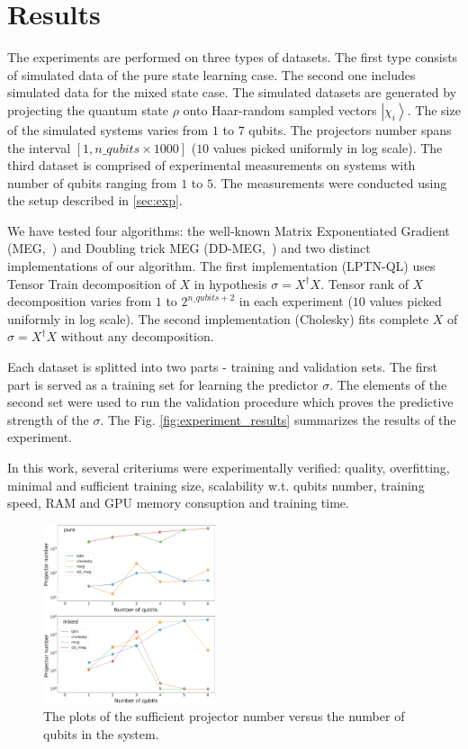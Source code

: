 \documentclass[%
 reprint,
 amsmath,amssymb,
 aps,
]{revtex4-2}
\begin{document}
\section{Results}

The experiments are performed on three types of datasets. The first type consists of simulated data of the pure state learning case. The second one includes simulated data for the mixed state case. The simulated datasets are generated by projecting the quantum state $\rho$ onto Haar-random sampled vectors $\left|\chi_{i}\right\rangle$. The size of the simulated systems varies from $1$ to $7$ qubits. The projectors number spans the interval $[1, n\_qubits\times1000]$ ($10$ values picked uniformly in log scale). The third dataset is comprised of experimental measurements on systems with number of qubits ranging from $1$ to $5$. The measurements were conducted using the setup described in \ref{sec:exp}.

We have tested four algorithms: the well-known Matrix Exponentiated Gradient (MEG,~\cite{meg}) and Doubling trick MEG (DD-MEG,~\cite{ddmeg}) and two distinct implementations of our algorithm. The first implementation (LPTN-QL) uses Tensor Train decomposition of $X$ in hypothesis $\sigma = X^\dagger X$. Tensor rank of $X$ decomposition varies from $1$ to $2^{n\_qubits+2}$ in each experiment ($10$ values picked uniformly in log scale). The second implementation (Cholesky) fits complete $X$ of $\sigma = X^\dagger X$ without any decomposition.

Each dataset is splitted into two parts - training and validation sets. The first part is served as a training set for learning the predictor $\sigma$. The elements of the second set were used to run the validation procedure which proves the predictive strength of the $\sigma$. The Fig. \ref{fig:experiment_results} summarizes the results of the experiment. 

In this work, several criteriums were experimentally verified: quality, overfitting, minimal and sufficient training size, scalability w.t. qubits number, training speed, RAM and GPU memory consuption and training time. 

\begin{figure}
    \centering
    \includegraphics[width=0.45\textwidth]{img/sufficient_projectors_cnt_clean.pdf}
    \caption{The plots of the sufficient projector number versus the number of qubits in the system.}
    \label{fig:sufficient_projectors}
\end{figure}
\end{document}
